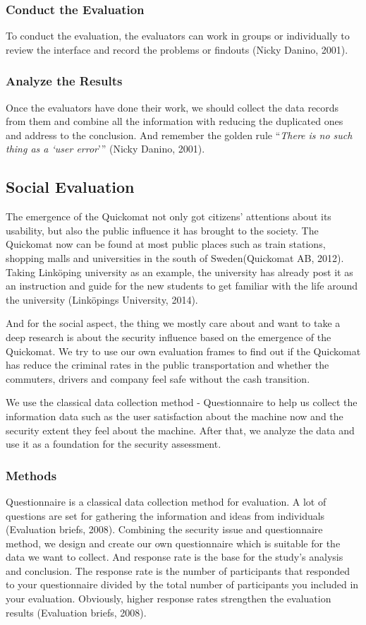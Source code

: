 \documentclass[twocolumn]{article}
\begin{document}
\subsubsection{Conduct the Evaluation}
To conduct the evaluation, the evaluators can work in groups or individually to review the interface and record the problems or findouts (Nicky Danino, 2001).

\subsubsection{Analyze the Results}
Once the evaluators have done their work, we should collect the data records from them and combine all the information with reducing the duplicated ones and address to the conclusion. And remember the golden rule “\emph{There is no such thing as a ‘user error}’” (Nicky Danino, 2001).

\subsection{Social Evaluation}
The emergence of the Quickomat not only got citizens’ attentions about its usability, but also the public influence it has brought to the society. The Quickomat now can be found at most public places such as train stations, shopping malls and universities in the south of Sweden(Quickomat AB, 2012). Taking Linköping university as an example, the university has already post it as an instruction and guide for the new students to get familiar with the life around the university (Linköpings University, 2014). 

And for the social aspect, the thing we mostly care about and want to take a deep research is about the security influence based on the emergence of the Quickomat. We try to use our own evaluation frames to find out if the Quickomat has reduce the criminal rates in the public transportation and whether the commuters, drivers and company feel safe without the cash transition. 

We use the classical data collection method - Questionnaire to help us collect the information data such as the user satisfaction about the machine now and the security extent they feel about the machine.
After that, we analyze the data and use it as a foundation for the security assessment.

\subsubsection{Methods}
Questionnaire is a classical data collection method for evaluation. A lot of questions are set for gathering the information and ideas from individuals (Evaluation briefs, 2008). Combining the security issue and questionnaire method, we design and create our own questionnaire which is suitable for the data we want to collect. And response rate is the base for the study’s analysis and conclusion. The response rate is the number of participants that responded to your questionnaire divided by the total number of participants you included in your evaluation. Obviously, higher response rates strengthen the evaluation results (Evaluation briefs, 2008). 
\end{document}
